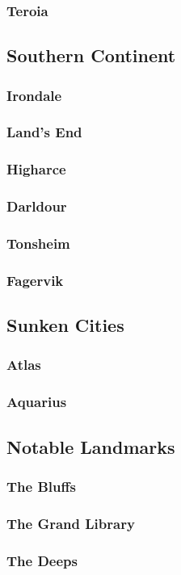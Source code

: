 		\subsubsection{Teroia}

	\subsection{Southern Continent}

		\subsubsection{Irondale}

		\subsubsection{Land's End}

		\subsubsection{Higharce}
	
		\subsubsection{Darldour}

		\subsubsection{Tonsheim}

		\subsubsection{Fagervik}

	\subsection{Sunken Cities}

		\subsubsection{Atlas}

		\subsubsection{Aquarius}
	
	\subsection{Notable Landmarks}

		\subsubsection{The Bluffs}
		
		\subsubsection{The Grand Library}

		\subsubsection{The Deeps}
